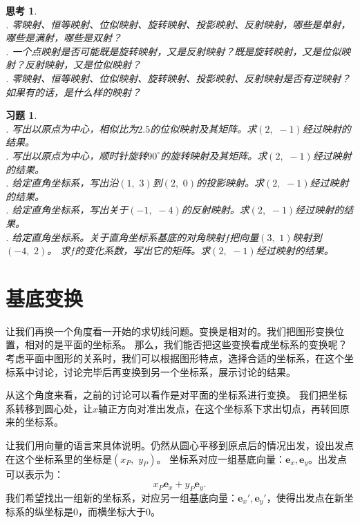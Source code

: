 \documentclass[12pt,UTF8]{ctexbook}
\newtheorem{sk}{思考}[section]
\newtheorem{xt}{习题}[section]
\begin{document}
\begin{sk}
    \mbox{} \\
    . 零映射、恒等映射、位似映射、旋转映射、投影映射、反射映射，哪些是单射，哪些是满射，哪些是双射？\\
    . 一个点映射是否可能既是旋转映射，又是反射映射？既是旋转映射，又是位似映射？反射映射，又是位似映射？\\
    . 零映射、恒等映射、位似映射、旋转映射、投影映射、反射映射是否有逆映射？如果有的话，是什么样的映射？
\end{sk}

\begin{xt}
    \mbox{} \\
    . 写出以原点为中心，相似比为$2.5$的位似映射及其矩阵。求$(2,\,\,-1)$经过映射的结果。\\
    . 写出以原点为中心，顺时针旋转$90^\circ$的旋转映射及其矩阵。求$(2,\,\,-1)$经过映射的结果。\\
    . 给定直角坐标系，写出沿$(1,\,\,3)$到$(2,\,\,0)$的投影映射。求$(2,\,\,-1)$经过映射的结果。\\
    . 给定直角坐标系，写出关于$(-1,\,\,-4)$的反射映射。求$(2,\,\,-1)$经过映射的结果。\\
    . 给定直角坐标系。关于直角坐标系基底的对角映射$f$把向量$(3,\,\,1)$映射到$(-4,\,\,2)$。
               求$f$的变化系数，写出它的矩阵。求$(2,\,\,-1)$经过映射的结果。
\end{xt}

\section{基底变换}

让我们再换一个角度看一开始的求切线问题。变换是相对的。我们把图形变换位置，相对的是平面的坐标系。
那么，我们能否把这些变换看成坐标系的变换呢？
考虑平面中图形的关系时，我们可以根据图形特点，选择合适的坐标系，在这个坐标系中讨论，讨论完毕后再变换到另一个坐标系，展示讨论的结果。

从这个角度来看，之前的讨论可以看作是对平面的坐标系进行变换。
我们把坐标系转移到圆心处，让$x$轴正方向对准出发点，在这个坐标系下求出切点，再转回原来的坐标系。

让我们用向量的语言来具体说明。仍然从圆心平移到原点后的情况出发，设出发点在这个坐标系里的坐标是$(x_P,\,\,y_P)$。
坐标系对应一组基底向量：$\mathbf{e}_x, \mathbf{e}_y$。出发点可以表示为：
$$ x_P\mathbf{e}_x + y_P\mathbf{e}_y. $$
我们希望找出一组新的坐标系，对应另一组基底向量：$\mathbf{e}_x', \mathbf{e}_y'$，使得出发点在新坐标系的纵坐标是$0$，而横坐标大于$0$。
\end{document}

